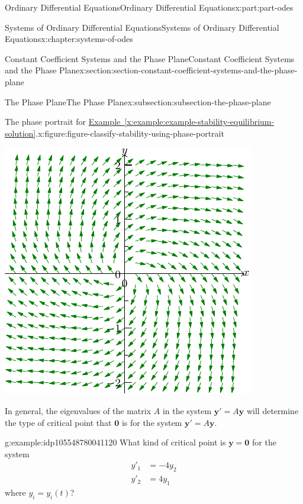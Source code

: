 \documentclass[oneside,10pt,]{book}
\newcommand{\xreffont}{\relax}
\numberwithin{equation}{part}
\renewcommand{\vec}[1]{\mathbf{#1}}
\newcommand{\amp}{&}
\begin{document}
\begin{partptx}{Ordinary Differential Equations}{}{Ordinary Differential Equations}{}{}{x:part:part-odes}
\begin{chapterptx}{Systems of Ordinary Differential Equations}{}{Systems of Ordinary Differential Equations}{}{}{x:chapter:systems-of-odes}
\begin{sectionptx}{Constant Coefficient Systems and the Phase Plane}{}{Constant Coefficient Systems and the Phase Plane}{}{}{x:section:section-constant-coefficient-systems-and-the-phase-plane}
\begin{subsectionptx}{The Phase Plane}{}{The Phase Plane}{}{}{x:subsection:subsection-the-phase-plane}
\begin{figureptx}{The phase portrait for \hyperref[x:example:example-stability-equilibrium-solution]{Example~{\xreffont\ref{x:example:example-stability-equilibrium-solution}}}.}{x:figure:figure-classify-stability-using-phase-portrait}{}
\begin{image}{0.25}{0.5}{0.25}
\includegraphics[width=\linewidth]{generated/asymptote/image-16.pdf}
\end{image}%
\tcblower
\end{figureptx}%
In general, the eigenvalues of the matrix \(A\) in the system \(\vec{y}' = A\vec{y}\) will determine the type of critical point that \(\vec{0}\) is for the system \(\vec{y}'=A\vec{y}\).%
\begin{example}{}{g:example:idp105548780041120}%
What kind of critical point is \(\vec{y} = \vec{0}\) for the system%
\begin{align*}
y'_{1} \amp = -4y_{2}\\
y'_{2}  \amp =  4y_{1}
\end{align*}
where \(y_{i} = y_{i}(t)\)?%
\par\smallskip%

\end{example}
\end{subsectionptx}
\end{sectionptx}
\end{chapterptx}
\end{partptx}
\end{document}
